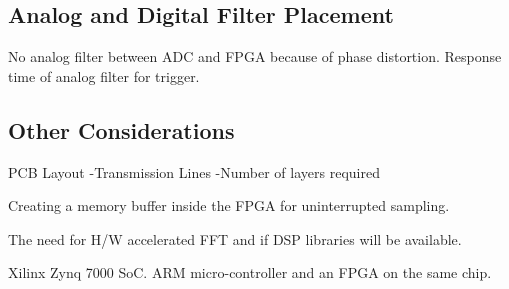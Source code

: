\documentclass[12pt]{article}
\begin{document}
\subsection{Analog and Digital Filter Placement}
	No analog filter between ADC and FPGA because of phase distortion.
    Response time of analog filter for trigger.

\subsection{Other Considerations}
	PCB Layout
    	-Transmission Lines
        -Number of layers required

	Creating a memory buffer inside the FPGA for uninterrupted sampling.
    
    The need for H/W accelerated FFT and if DSP libraries will be available.
    
    Xilinx Zynq 7000 SoC. ARM micro-controller and an FPGA on the same chip.
\end{document}
